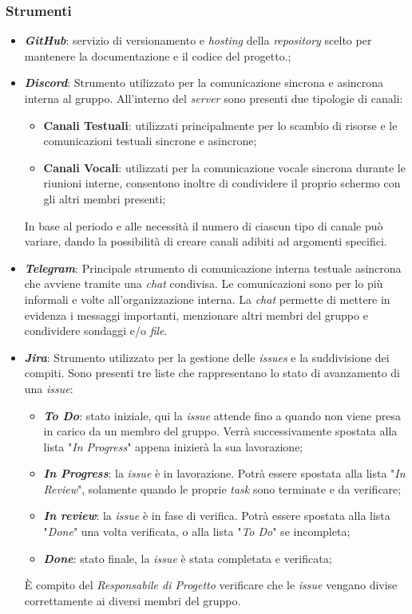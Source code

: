 \documentclass[5pt]{article}
\begin{document}
\subsubsection{Strumenti}
\begin{itemize}
	
	\item\textit{\textbf{GitHub}}: servizio di versionamento e \textit{hosting} della \textit{repository} scelto per mantenere la documentazione e il codice del progetto.;	
	\item \textbf{\textit{Discord}}: Strumento utilizzato per la comunicazione sincrona e asincrona interna al gruppo. All'interno del \textit{server} sono presenti due tipologie di canali:
	\begin{itemize}
		\item\textbf{Canali Testuali}: utilizzati principalmente per lo scambio di risorse e le comunicazioni testuali sincrone e asincrone;
		\item\textbf{Canali Vocali}: utilizzati per la comunicazione vocale sincrona durante le riunioni interne, consentono inoltre di condividere il proprio schermo con gli altri membri presenti;
	\end{itemize}
	In base al periodo e alle necessità il numero di ciascun tipo di canale può variare, dando la possibilità di creare canali adibiti ad argomenti specifici.
	
	\item \textit{\textbf{Telegram}}: Principale strumento di comunicazione interna testuale asincrona che avviene tramite una \textit{chat} condivisa. Le comunicazioni sono per lo più informali e volte all'organizzazione interna. La \textit{chat} permette di mettere in evidenza i messaggi importanti, menzionare altri membri del gruppo e condividere sondaggi e/o \textit{file}.
	
	\item \textit{\textbf{Jira}}: Strumento utilizzato per la gestione delle \textit{issues} e la suddivisione dei compiti. Sono presenti tre liste che rappresentano lo stato di avanzamento di una \textit{issue}:
	\begin{itemize} 
		\item\textbf{\textit{To Do}}: stato iniziale, qui la \textit{issue} attende fino a quando non viene presa in carico da un membro del gruppo. Verrà successivamente spostata alla lista "\textit{In Progress}" appena inizierà la sua lavorazione;
		\item\textbf{\textit{In Progress}}: la \textit{issue} è in lavorazione. Potrà essere spostata alla lista "\textit{In Review}", solamente quando le proprie \textit{task} sono terminate e da verificare;
		\item\textbf{\textit{In review}}: la \textit{issue} è in fase di verifica. Potrà essere spostata alla lista "\textit{Done}" una volta verificata, o alla lista "\textit{To Do}" se incompleta;
		\item\textbf{\textit{Done}}: stato finale, la \textit{issue} è stata completata e verificata;
	\end{itemize}
	È compito del \textit{Responsabile di Progetto} verificare che le \textit{issue} vengano divise correttamente ai diversi membri del gruppo. 
	

\end{itemize}
\end{document}
